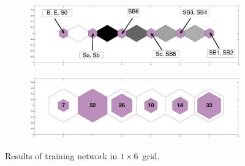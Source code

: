     \begin{figure}
        \begin{subfigure}[b]{0.5\textwidth}
            \centering
            \includegraphics[width=\textwidth]{../images0.01/1d/apps/dist_1_by_6.png}
        \end{subfigure}
        \hfill
        \begin{subfigure}[b]{0.5\textwidth}
             \includegraphics[width=\textwidth]{../images0.01/1d/apps/hit_v_1_by_6.png}
        \end{subfigure}
                \caption{Results of training network in $1\times6$~grid.}
         \label{fig: 1by6T}
    \end{figure}
    
